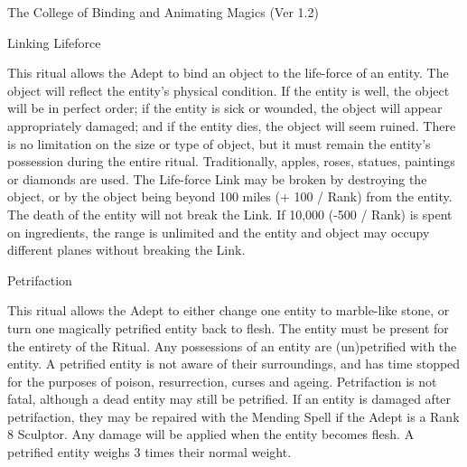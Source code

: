 \begin{Chapter}{The College of Binding and Animating Magics (Ver 1.2)}
\begin{ritual}[Q-1]{Linking Lifeforce }
\begin{effects}
This ritual allows the Adept to bind an object to the life-force of an
entity. The object will reflect the entity’s physical condition.  If
the entity is well, the object will be in perfect order; if the entity
is sick or wounded, the object will appear appropriately damaged; and
if the entity dies, the object will seem ruined.  There is no
limitation on the size or type of object, but it must remain the
entity’s possession during the entire ritual.  Traditionally, apples,
roses, statues, paintings or diamonds are used.  The Life-force Link
may be broken by destroying the object, or by the object being beyond
100 miles (+ 100 / Rank) from the entity.  The death of the entity
will not break the Link.  If 10,000 (-500 / Rank) is spent on
ingredients, the range is unlimited and the entity and object may
occupy different planes without breaking the Link.
\end{effects}
\end{ritual}

\begin{ritual}[Q-2]{Petrifaction }

\begin{effects}
This ritual allows the Adept to either change one entity to
marble-like stone, or turn one magically petrified entity back to
flesh.  The entity must be present for the entirety of the Ritual.
Any possessions of an entity are (un)petrified with the entity.  A
petrified entity is not aware of their surroundings, and has time
stopped for the purposes of poison, resurrection, curses and
ageing. Petrifaction is not fatal, although a dead entity may still be
petrified. If an entity is damaged after petrifaction, they may be
repaired with the Mending Spell if the Adept is a Rank 8 Sculptor.
Any damage will be applied when the entity becomes flesh. A petrified
entity weighs 3 times their normal weight.
\end{effects}
\end{ritual}


\end{Chapter}
